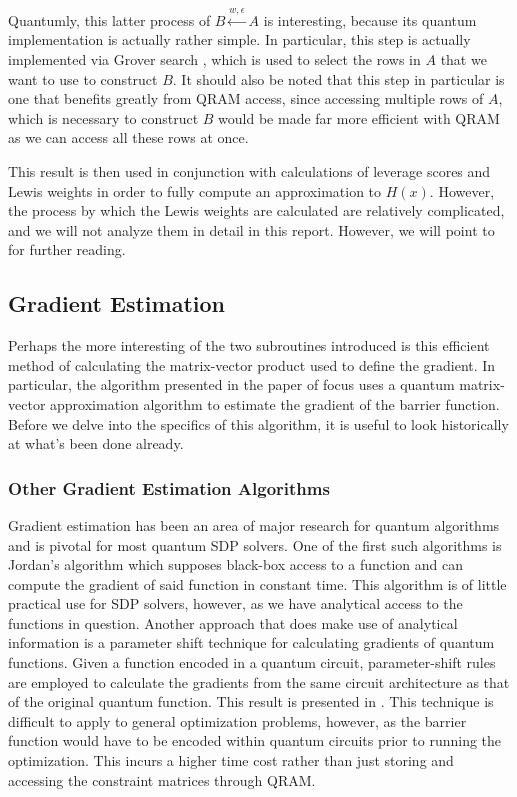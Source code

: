 \documentclass[11pt]{article}
\begin{document}
Quantumly, this latter process of \( B \overset{w, \epsilon}{\leftarrow} A \) is interesting, because its quantum 
implementation is actually rather simple. In particular, this step is actually implemented via Grover search 
\cite{apersQuantumSpeedupGraph2023}, which 
is used to select the rows in \( A \) that we want to use to construct \( B \). It should also be noted that 
this step in particular is one that benefits greatly from QRAM access, since accessing multiple rows of \( A \), which 
is necessary to construct \( B \) would be made far more efficient with QRAM as we can access all these rows 
at once.  
 
This result is then used in conjunction with calculations of leverage scores and Lewis weights in order to 
fully compute an approximation to \( H(x) \). However, the process by which the Lewis weights 
are calculated are relatively complicated, and we will not analyze them in detail in this report. However, 
we will point to \cite{apersQuantumSpeedupsLinear2024} for further reading.  


\subsection{Gradient Estimation} 
\label{Gradient Estimation}
Perhaps the more interesting of the two subroutines introduced is this efficient method of calculating the matrix-vector product used to define the gradient. In particular, the algorithm presented in 
the paper of focus \cite{apersQuantumSpeedupsLinear2024} uses a quantum matrix-vector approximation algorithm to estimate the gradient of the barrier function. Before we 
delve into the specifics of this algorithm, it is useful to look historically at what's 
been done already.

\subsubsection{Other Gradient Estimation Algorithms}
\label{Other Gradient Estimations}
Gradient estimation has been an area of major research for quantum algorithms and is pivotal for most quantum SDP solvers. 
One of the first such algorithms is Jordan's algorithm \cite{jordanFastQuantumAlgorithm2005} which supposes black-box access to a function 
and can compute the gradient of said function in constant time. 
This algorithm is of little practical use for SDP solvers, 
however, as we have analytical access to the functions in question. Another approach that does make use of analytical information is a parameter shift technique for calculating gradients of quantum functions. Given a function encoded in a quantum circuit, parameter-shift rules are employed to calculate the gradients from the same circuit architecture as that of the original quantum function. This result is presented in \cite{wierichsGeneralParametershiftRules2022}. This technique is difficult to apply to general optimization problems, however, as the barrier function would have to be encoded within quantum circuits prior to running the optimization. This incurs a higher time cost rather than just storing and accessing the constraint matrices through QRAM.
\end{document}
